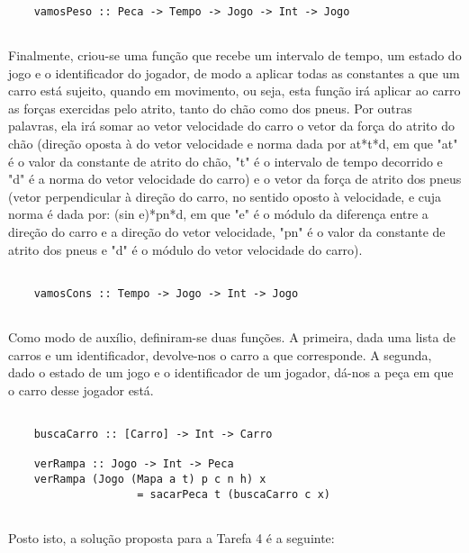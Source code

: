 \documentclass[a4paper]{report} %
\begin{document}
  \begin{verbatim}
      
    vamosPeso :: Peca -> Tempo -> Jogo -> Int -> Jogo
      
  \end{verbatim}
  
  \newpage
  
  \par \noindent Finalmente, criou-se uma função que recebe um intervalo de tempo, um estado do jogo e o identificador do jogador, de modo a aplicar todas as constantes a que um carro está sujeito, quando em movimento, ou seja, esta função irá aplicar ao carro as forças exercidas pelo atrito, tanto do chão como dos pneus. Por outras palavras, ela irá somar ao vetor velocidade do carro o vetor da força do atrito do chão (direção oposta à do vetor velocidade e norma dada por at*t*d, em que "at" é o valor da constante de atrito do chão, "t" é o intervalo de tempo decorrido e "d" é a norma do vetor velocidade do carro) e o vetor da força de atrito dos pneus (vetor perpendicular à direção do carro, no sentido oposto à velocidade, e cuja norma é dada por: (sin e)*pn*d, em que "e" é o módulo da diferença entre a direção do carro e a direção do vetor velocidade, "pn" é o valor da constante de atrito dos pneus e "d" é o módulo do vetor velocidade do carro).
  
  \begin{verbatim}
      
    vamosCons :: Tempo -> Jogo -> Int -> Jogo
      
  \end{verbatim}
  
  \par \noindent Como modo de auxílio, definiram-se duas funções. A primeira, dada uma lista de carros e um identificador, devolve-nos o carro a que corresponde. A segunda, dado o estado de um jogo e o identificador de um jogador, dá-nos a peça em que o carro desse jogador está.
  
  \begin{verbatim}
      
    buscaCarro :: [Carro] -> Int -> Carro
      
    verRampa :: Jogo -> Int -> Peca
    verRampa (Jogo (Mapa a t) p c n h) x 
                    = sacarPeca t (buscaCarro c x)
      
  \end{verbatim}
  
  \par \noindent Posto isto, a solução proposta para a Tarefa 4 é a seguinte:
  
\end{document}
